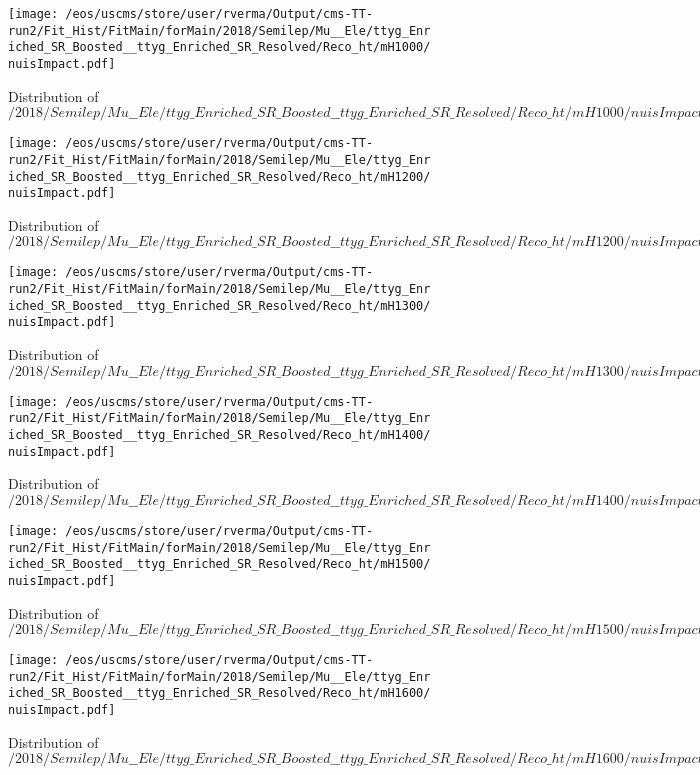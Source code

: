 \begin{figure}
\centering
\texttt{[image: /eos/uscms/store/user/rverma/Output/cms-TT-run2/Fit\_Hist/FitMain/forMain/2018/Semilep/Mu\_\_Ele/ttyg\_Enriched\_SR\_Boosted\_\_ttyg\_Enriched\_SR\_Resolved/Reco\_ht/mH1000/nuisImpact.pdf]}
\caption{Distribution of $/2018/Semilep/Mu\_\_Ele/ttyg\_Enriched\_SR\_Boosted\_\_ttyg\_Enriched\_SR\_Resolved/Reco\_ht/mH1000/nuisImpact.pdf$}
\end{figure}

\begin{figure}
\centering
\texttt{[image: /eos/uscms/store/user/rverma/Output/cms-TT-run2/Fit\_Hist/FitMain/forMain/2018/Semilep/Mu\_\_Ele/ttyg\_Enriched\_SR\_Boosted\_\_ttyg\_Enriched\_SR\_Resolved/Reco\_ht/mH1200/nuisImpact.pdf]}
\caption{Distribution of $/2018/Semilep/Mu\_\_Ele/ttyg\_Enriched\_SR\_Boosted\_\_ttyg\_Enriched\_SR\_Resolved/Reco\_ht/mH1200/nuisImpact.pdf$}
\end{figure}

\begin{figure}
\centering
\texttt{[image: /eos/uscms/store/user/rverma/Output/cms-TT-run2/Fit\_Hist/FitMain/forMain/2018/Semilep/Mu\_\_Ele/ttyg\_Enriched\_SR\_Boosted\_\_ttyg\_Enriched\_SR\_Resolved/Reco\_ht/mH1300/nuisImpact.pdf]}
\caption{Distribution of $/2018/Semilep/Mu\_\_Ele/ttyg\_Enriched\_SR\_Boosted\_\_ttyg\_Enriched\_SR\_Resolved/Reco\_ht/mH1300/nuisImpact.pdf$}
\end{figure}

\begin{figure}
\centering
\texttt{[image: /eos/uscms/store/user/rverma/Output/cms-TT-run2/Fit\_Hist/FitMain/forMain/2018/Semilep/Mu\_\_Ele/ttyg\_Enriched\_SR\_Boosted\_\_ttyg\_Enriched\_SR\_Resolved/Reco\_ht/mH1400/nuisImpact.pdf]}
\caption{Distribution of $/2018/Semilep/Mu\_\_Ele/ttyg\_Enriched\_SR\_Boosted\_\_ttyg\_Enriched\_SR\_Resolved/Reco\_ht/mH1400/nuisImpact.pdf$}
\end{figure}

\begin{figure}
\centering
\texttt{[image: /eos/uscms/store/user/rverma/Output/cms-TT-run2/Fit\_Hist/FitMain/forMain/2018/Semilep/Mu\_\_Ele/ttyg\_Enriched\_SR\_Boosted\_\_ttyg\_Enriched\_SR\_Resolved/Reco\_ht/mH1500/nuisImpact.pdf]}
\caption{Distribution of $/2018/Semilep/Mu\_\_Ele/ttyg\_Enriched\_SR\_Boosted\_\_ttyg\_Enriched\_SR\_Resolved/Reco\_ht/mH1500/nuisImpact.pdf$}
\end{figure}

\begin{figure}
\centering
\texttt{[image: /eos/uscms/store/user/rverma/Output/cms-TT-run2/Fit\_Hist/FitMain/forMain/2018/Semilep/Mu\_\_Ele/ttyg\_Enriched\_SR\_Boosted\_\_ttyg\_Enriched\_SR\_Resolved/Reco\_ht/mH1600/nuisImpact.pdf]}
\caption{Distribution of $/2018/Semilep/Mu\_\_Ele/ttyg\_Enriched\_SR\_Boosted\_\_ttyg\_Enriched\_SR\_Resolved/Reco\_ht/mH1600/nuisImpact.pdf$}
\end{figure}

